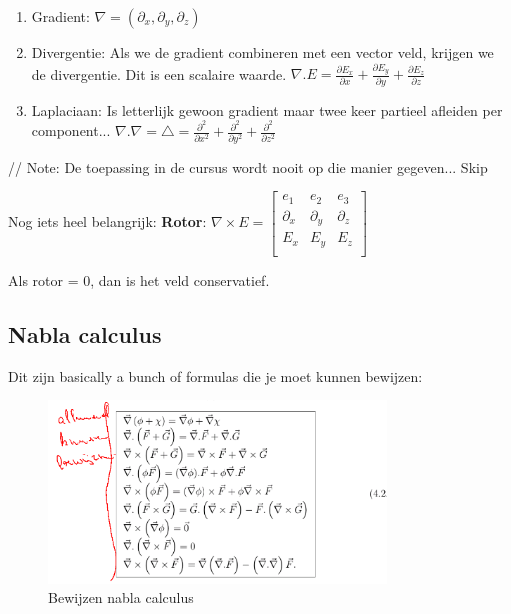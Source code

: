 \documentclass[a4paper]{report}
\begin{document}
\begin{enumerate}

	\item Gradient: $\nabla = (\partial_x, \partial_y, \partial_z)$
	\item Divergentie: Als we de gradient combineren met een vector veld, krijgen we de divergentie. Dit is een scalaire waarde. $\nabla . E = \frac{\partial E_x}{\partial x} + \frac{\partial E_y}{\partial y} + \frac{\partial E_z}{\partial z}$
	\item Laplaciaan: Is letterlijk gewoon gradient maar twee keer partieel afleiden per component... $\nabla . \nabla = \triangle = \frac{\partial^2}{\partial x^2} + \frac{\partial^2}{\partial y^2} + \frac{\partial^2}{\partial z^2}$
\end{enumerate}

// Note: De toepassing in de cursus wordt nooit op die manier gegeven... Skip

Nog iets heel belangrijk: \textbf{Rotor}: $\nabla \times E = \begin{bmatrix} e_1 & e_2 & e_3 \\ \partial_x & \partial_y & \partial_z \\ E_x & E_y & E_z \\ \end{bmatrix}$

Als rotor = 0, dan is het veld conservatief.

\subsection{Nabla calculus}

Dit zijn basically a bunch of formulas die je moet kunnen bewijzen:


\begin{figure}[H]
	\centering
	\includegraphics[width=0.8\textwidth]{assets/bewijzen_nabla_calculus.png}
	\caption{Bewijzen nabla calculus}
	\label{fig:bewijzen_nabla_calculus}
\end{figure}
\end{document}
